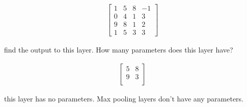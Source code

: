 \begin{Parts}
\begin{enumerate}
\begin{align*}
\begin{bmatrix}
1 & 5 & 8 & -1 \\
0 & 4 & 1 & 3 \\
9 & 8 & 1 & 2 \\
1 & 5 & 3 & 3
\end{bmatrix}
\end{align*}

find the output to this layer. How many parameters does this layer have?

\begin{solution}

\begin{align*}
\begin{bmatrix}
5 & 8 \\
9 & 3 \\
\end{bmatrix}
\end{align*}

this layer has no parameters. Max pooling layers don't have any parameters.

\end{solution}

\end{enumerate}


\end{Parts}
